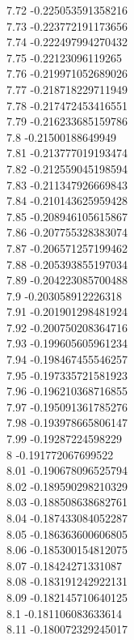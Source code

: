 {7.72	-0.225053591358216\\
7.73	-0.223772191173656\\
7.74	-0.222497994270432\\
7.75	-0.22123096119265\\
7.76	-0.219971052689026\\
7.77	-0.218718229711949\\
7.78	-0.217472453416551\\
7.79	-0.216233685159786\\
7.8	-0.21500188649949\\
7.81	-0.213777019193474\\
7.82	-0.212559045198594\\
7.83	-0.211347926669843\\
7.84	-0.210143625959428\\
7.85	-0.208946105615867\\
7.86	-0.207755328383074\\
7.87	-0.206571257199462\\
7.88	-0.205393855197034\\
7.89	-0.204223085700488\\
7.9	-0.203058912226318\\
7.91	-0.201901298481924\\
7.92	-0.200750208364716\\
7.93	-0.199605605961234\\
7.94	-0.198467455546257\\
7.95	-0.197335721581923\\
7.96	-0.196210368716855\\
7.97	-0.195091361785276\\
7.98	-0.193978665806147\\
7.99	-0.19287224598229\\
8	-0.191772067699522\\
8.01	-0.190678096525794\\
8.02	-0.189590298210329\\
8.03	-0.188508638682761\\
8.04	-0.187433084052287\\
8.05	-0.186363600606805\\
8.06	-0.185300154812075\\
8.07	-0.18424271331087\\
8.08	-0.183191242922131\\
8.09	-0.182145710640125\\
8.1	-0.181106083633614\\
8.11	-0.180072329245017\\
}
